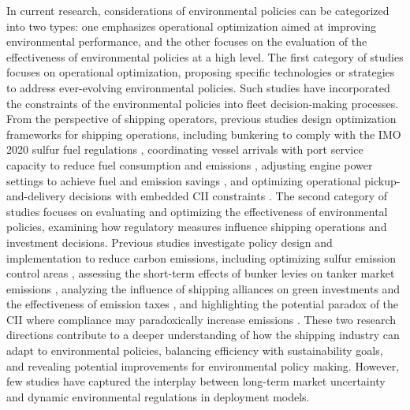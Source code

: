\documentclass[11pt,english]{article}
\begin{document}
In current research, considerations of environmental policies can be categorized into two types: one emphasizes operational optimization aimed at improving environmental performance, and the other focuses on the evaluation of the effectiveness of environmental policies at a high level. The first category of studies focuses on operational optimization, proposing specific technologies or strategies to address ever-evolving environmental policies. Such studies have incorporated the constraints of the  environmental policies into fleet decision-making processes. From the perspective of shipping operators, previous studies design optimization frameworks for shipping operations, including bunkering to comply with the IMO 2020 sulfur fuel regulations \citep{de2023sailing}, coordinating vessel arrivals with port service capacity to reduce fuel consumption and emissions \citep{sung2022multi}, adjusting engine power settings to achieve fuel and emission savings \citep{wang2021voyage}, and optimizing operational pickup-and-delivery decisions with embedded CII constraints \citep{cheng2025cargo}. The second category of studies focuses on evaluating and optimizing the effectiveness of environmental policies, examining how regulatory measures influence shipping operations and investment decisions. Previous studies investigate policy design and implementation to reduce carbon emissions, including optimizing sulfur emission control areas \citep{zhuge2024shipping}, assessing the short-term effects of bunker levies on tanker market emissions \citep{lagouvardou2022impacts}, analyzing the influence of shipping alliances on green investments and the effectiveness of emission taxes \citep{shang2024would}, and highlighting the potential paradox of the CII where compliance may paradoxically increase emissions \citep{wang2021paradox}. These two research directions contribute to a deeper understanding of how the shipping industry can adapt to environmental policies, balancing efficiency with sustainability goals, and revealing potential improvements for environmental policy making. However, few studies have captured the interplay between long-term market uncertainty and dynamic environmental regulations in deployment models.
\end{document}
